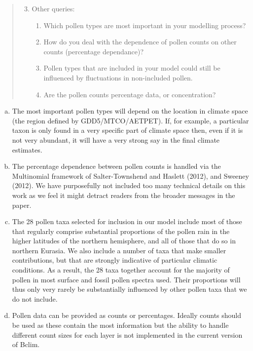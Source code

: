 \documentclass[a4paper,11pt]{article}
\begin{document}
\begin{framed} \begin{quote}
\begin{enumerate}
\setcounter{enumi}{2}
\item Other queries:
\begin{enumerate}
\item Which pollen types are most important in your modelling process?
\item How do you deal with the dependence of pollen counts on other counts (percentage dependance)? 
\item Pollen types that are included in your model could still be influenced by fluctuations in non-included pollen. 
\item Are the pollen counts percentage data, or concentration? 
\end{enumerate}
\end{enumerate}
\end{quote} \end{framed}

\begin{enumerate}[(a)]
\item The most important pollen types will depend on the location in climate space (the region defined by GDD5/MTCO/AETPET). If, for example, a particular taxon is only found in a very specific part of climate space then, even if it is not very abundant, it will have a very strong say in the final climate estimates.
\item The percentage dependence between pollen counts is handled via the Multinomial framework of Salter-Townshend and Haslett (2012), and Sweeney (2012). We have purposefully not included too many technical details on this work as we feel it might detract readers from the broader messages in the paper.
\item The 28 pollen taxa selected for inclusion in our model include most of those that regularly comprise substantial proportions of the pollen rain in the higher latitudes of the northern hemisphere, and all of those that do so in northern Eurasia. We also include a number of taxa that make smaller contributions, but that are strongly indicative of particular climatic conditions. As a result, the 28 taxa together account for the majority of pollen in most surface and fossil pollen spectra used. Their proportions will thus only very rarely be substantially influenced by other pollen taxa that we do not include.
\item Pollen data can be provided as counts or percentages. Ideally counts should be used as these contain the most information but the ability to handle different count sizes for each layer is not implemented in the current version of Bclim.
\end{enumerate}
\end{document}

